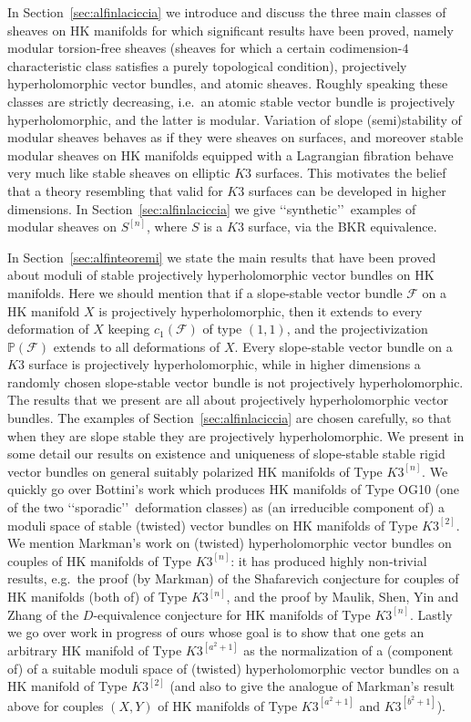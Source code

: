 \documentclass[11pt]{amsart}
\newcommand{\PP}{{\mathbb P}}
\let\mathcal\mathscr
\def\cF{\mathcal{F}}
\theoremstyle{definition}
\theoremstyle{remark}
\begin{document}
In Section~\ref{sec:alfinlaciccia} we introduce and discuss the three main classes of sheaves on HK manifolds for which significant results have been proved, namely modular torsion-free sheaves (sheaves for which a certain codimension-$4$ characteristic class satisfies a purely topological condition),  projectively hyperholomorphic vector bundles, and atomic sheaves. Roughly speaking these classes are strictly decreasing, i.e.~an atomic stable vector bundle is projectively hyperholomorphic, and the latter is modular. 
Variation of slope (semi)stability
of modular sheaves   behaves as if they were sheaves on surfaces, and moreover stable modular sheaves on HK manifolds equipped with a Lagrangian fibration behave very much like stable sheaves on elliptic $K3$ surfaces. This motivates the belief that a theory resembling that valid for $K3$ surfaces can be developed in higher dimensions.
In Section~\ref{sec:alfinlaciccia} we give \lq\lq synthetic\rq\rq\ examples of modular sheaves on $S^{[n]}$, where
$S$ is a  $K3$ surface, via the BKR equivalence. 

In Section~\ref{sec:alfinteoremi} we state the main results that have been proved about moduli of stable projectively hyperholomorphic vector bundles on HK manifolds. Here we should  mention that if a slope-stable vector bundle $\cF$ on a HK manifold $X$ is projectively hyperholomorphic, then it extends to every deformation of $X$ keeping $c_1(\cF)$ of type $(1,1)$, and the projectivization $\PP(\cF)$ extends to all deformations of $X$. Every  slope-stable vector bundle on a $K3$ surface is projectively hyperholomorphic, while in higher dimensions 
a randomly chosen slope-stable vector bundle is not projectively hyperholomorphic. The  results that we present are all about   projectively hyperholomorphic vector bundles. 
The examples of Section~\ref{sec:alfinlaciccia} are chosen carefully, so that when they are slope stable they are projectively hyperholomorphic.
We present in some detail our results  on existence and uniqueness of slope-stable stable rigid vector bundles on general suitably polarized 
HK manifolds of Type $K3^{[n]}$. We quickly go over Bottini's work which produces HK manifolds of Type OG10 (one of the two \lq\lq sporadic\rq\rq\ deformation classes) as (an irreducible component of) a moduli space of stable (twisted) vector bundles on HK manifolds of Type $K3^{[2]}$. We  mention  Markman's work on (twisted) hyperholomorphic vector bundles on couples of HK manifolds  of Type $K3^{[n]}$: it has produced highly non-trivial results, e.g.~the proof (by Markman) of the Shafarevich conjecture for couples 
 of  HK manifolds (both of) of Type $K3^{[n]}$, and the proof by Maulik, Shen, Yin and Zhang of the $D$-equivalence conjecture for HK manifolds  of Type $K3^{[n]}$. Lastly we go over work in progress of ours whose goal is to show that one gets an arbitrary HK manifold  of Type $K3^{[a^2+1]}$ as the normalization of a (component of) of a suitable moduli space of (twisted) hyperholomorphic vector bundles on a HK manifold  of Type $K3^{[2]}$ (and also  
 to give the analogue of Markman's result above for couples 
$(X,Y)$ of  HK manifolds  of Type $K3^{[a^2+1]}$ and $K3^{[b^2+1]}$).
%
\end{document}
